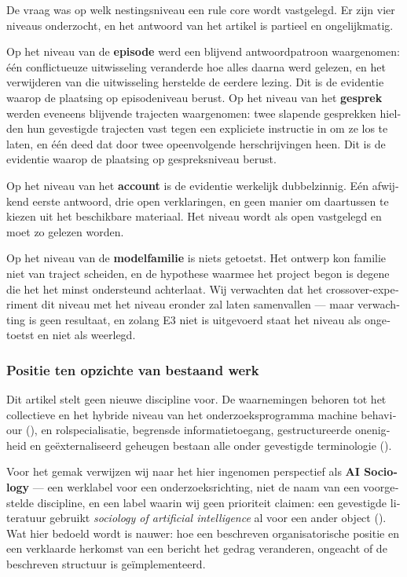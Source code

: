 \begin{dutch}
De vraag was op welk nestingsniveau een rule core wordt vastgelegd. Er zijn vier niveaus onderzocht, en het antwoord van het artikel is partieel en ongelijkmatig.

Op het niveau van de \textbf{episode} werd een blijvend antwoordpatroon waargenomen: één conflictueuze uitwisseling veranderde hoe alles daarna werd gelezen, en het verwijderen van die uitwisseling herstelde de eerdere lezing. Dit is de evidentie waarop de plaatsing op episodeniveau berust. Op het niveau van het \textbf{gesprek} werden eveneens blijvende trajecten waargenomen: twee slapende gesprekken hielden hun gevestigde trajecten vast tegen een expliciete instructie in om ze los te laten, en één deed dat door twee opeenvolgende herschrijvingen heen. Dit is de evidentie waarop de plaatsing op gespreksniveau berust.

Op het niveau van het \textbf{account} is de evidentie werkelijk dubbelzinnig. Eén afwijkend eerste antwoord, drie open verklaringen, en geen manier om daartussen te kiezen uit het beschikbare materiaal. Het niveau wordt als open vastgelegd en moet zo gelezen worden.

Op het niveau van de \textbf{modelfamilie} is niets getoetst. Het ontwerp kon familie niet van traject scheiden, en de hypothese waarmee het project begon is degene die het het minst ondersteund achterlaat. Wij verwachten dat het crossover-experiment dit niveau met het niveau eronder zal laten samenvallen — maar verwachting is geen resultaat, en zolang E3 niet is uitgevoerd staat het niveau als ongetoetst en niet als weerlegd.


\subsubsection*{Positie ten opzichte van bestaand werk}
\label{sec:nl:x-positie-ten-opzichte-van-bestaand-werk}

Dit artikel stelt geen nieuwe discipline voor. De waarnemingen behoren tot het collectieve en het hybride niveau van het onderzoeksprogramma machine behaviour (), en rolspecialisatie, begrensde informatietoegang, gestructureerde onenigheid en geëxternaliseerd geheugen bestaan alle onder gevestigde terminologie ().

Voor het gemak verwijzen wij naar het hier ingenomen perspectief als \textbf{AI Sociology} — een werklabel voor een onderzoeksrichting, niet de naam van een voorgestelde discipline, en een label waarin wij geen prioriteit claimen: een gevestigde literatuur gebruikt \emph{sociology of artificial intelligence} al voor een ander object (). Wat hier bedoeld wordt is nauwer: hoe een beschreven organisatorische positie en een verklaarde herkomst van een bericht het gedrag veranderen, ongeacht of de beschreven structuur is geïmplementeerd.


\end{dutch}
